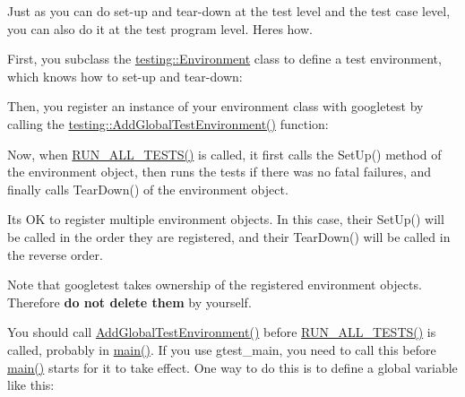 Just as you can do set-\/up and tear-\/down at the test level and the test case level, you can also do it at the test program level. Here\textquotesingle{}s how.

First, you subclass the {\ttfamily \mbox{\hyperlink{classtesting_1_1Environment}{testing\+::\+Environment}}} class to define a test environment, which knows how to set-\/up and tear-\/down\+:


\begin{DoxyCode}{0}
\DoxyCodeLine{}
\DoxyCodeLine{}
\DoxyCodeLine{\};}
\end{DoxyCode}


Then, you register an instance of your environment class with googletest by calling the {\ttfamily \mbox{\hyperlink{namespacetesting_a460d7b998622e332392c1e00be3a60d5}{testing\+::\+Add\+Global\+Test\+Environment()}}} function\+:


\begin{DoxyCode}{0}
\end{DoxyCode}


Now, when {\ttfamily \mbox{\hyperlink{gtest_8h_a853a3792807489591d3d4a2f2ff9359f}{R\+U\+N\+\_\+\+A\+L\+L\+\_\+\+T\+E\+S\+T\+S()}}} is called, it first calls the {\ttfamily Set\+Up()} method of the environment object, then runs the tests if there was no fatal failures, and finally calls {\ttfamily Tear\+Down()} of the environment object.

It\textquotesingle{}s OK to register multiple environment objects. In this case, their {\ttfamily Set\+Up()} will be called in the order they are registered, and their {\ttfamily Tear\+Down()} will be called in the reverse order.

Note that googletest takes ownership of the registered environment objects. Therefore {\bfseries{do not delete them}} by yourself.

You should call {\ttfamily \mbox{\hyperlink{namespacetesting_a460d7b998622e332392c1e00be3a60d5}{Add\+Global\+Test\+Environment()}}} before {\ttfamily \mbox{\hyperlink{gtest_8h_a853a3792807489591d3d4a2f2ff9359f}{R\+U\+N\+\_\+\+A\+L\+L\+\_\+\+T\+E\+S\+T\+S()}}} is called, probably in {\ttfamily \mbox{\hyperlink{3_814_83_2CompilerIdC_2CMakeCCompilerId_8c_a0ddf1224851353fc92bfbff6f499fa97}{main()}}}. If you use {\ttfamily gtest\+\_\+main}, you need to call this before {\ttfamily \mbox{\hyperlink{3_814_83_2CompilerIdC_2CMakeCCompilerId_8c_a0ddf1224851353fc92bfbff6f499fa97}{main()}}} starts for it to take effect. One way to do this is to define a global variable like this\+:


